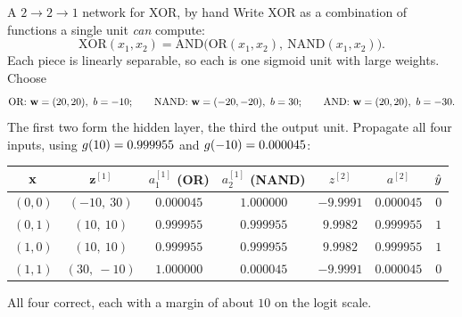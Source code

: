 \begin{workedexample}{A $2\to2\to1$ network for XOR, by hand}
Write XOR as a combination of functions a single unit \emph{can} compute:
\[
  \mathrm{XOR}(x_1,x_2) = \mathrm{AND}\bigl(\mathrm{OR}(x_1,x_2),\
                                           \mathrm{NAND}(x_1,x_2)\bigr).
\]
Each piece is linearly separable, so each is one sigmoid unit with large weights.
Choose
\[
  \text{OR: } \mathbf{w} = (20, 20),\ b = -10; \qquad
  \text{NAND: } \mathbf{w} = (-20,-20),\ b = 30; \qquad
  \text{AND: } \mathbf{w} = (20, 20),\ b = -30 .
\]
The first two form the hidden layer, the third the output unit. Propagate all
four inputs, using $g(10) = 0.999955$ and $g(-10) = 0.000045$:

\begin{center}
\small
\setlength{\tabcolsep}{5pt}
\renewcommand{\arraystretch}{1.2}
\begin{tabular}{@{}ccccccc@{}}
\toprule
$\mathbf{x}$ & $\mathbf{z}^{[1]}$ & $a^{[1]}_1$ (OR) & $a^{[1]}_2$ (NAND) & $z^{[2]}$ & $a^{[2]}$ & $\hat{y}$\\
\midrule
$(0,0)$ & $(-10,\ 30)$ & $0.000045$ & $1.000000$ & $-9.9991$ & $0.000045$ & $0$\\
$(0,1)$ & $(10,\ 10)$  & $0.999955$ & $0.999955$ & $9.9982$  & $0.999955$ & $1$\\
$(1,0)$ & $(10,\ 10)$  & $0.999955$ & $0.999955$ & $9.9982$  & $0.999955$ & $1$\\
$(1,1)$ & $(30,\ -10)$ & $1.000000$ & $0.000045$ & $-9.9991$ & $0.000045$ & $0$\\
\bottomrule
\end{tabular}
\end{center}

All four correct, each with a margin of about $10$ on the logit scale.
\end{workedexample}

